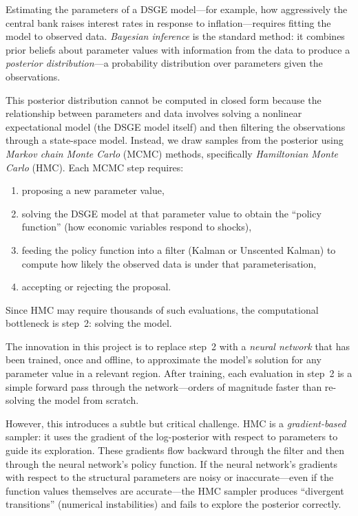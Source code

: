\documentclass[11pt,a4paper]{article}
\theoremstyle{definition}
\begin{document}
	Estimating the parameters of a DSGE model---for example, how aggressively the central bank raises interest rates in response to inflation---requires fitting the model to observed data.
	\emph{Bayesian inference} is the standard method: it combines prior beliefs about parameter values with information from the data to produce a \emph{posterior distribution}---a probability distribution over parameters given the observations.
	
	This posterior distribution cannot be computed in closed form because the relationship between parameters and data involves solving a nonlinear expectational model (the DSGE model itself) and then filtering the observations through a state-space model.
	Instead, we draw samples from the posterior using \emph{Markov chain Monte Carlo} (MCMC) methods, specifically \emph{Hamiltonian Monte Carlo} (HMC).
	Each MCMC step requires:
	\begin{enumerate}
		\item proposing a new parameter value,
		\item solving the DSGE model at that parameter value to obtain the ``policy function'' (how economic variables respond to shocks),
		\item feeding the policy function into a filter (Kalman or Unscented Kalman) to compute how likely the observed data is under that parameterisation,
		\item accepting or rejecting the proposal.
	\end{enumerate}
	Since HMC may require thousands of such evaluations, the computational bottleneck is step~2: solving the model.
	
	The innovation in this project is to replace step~2 with a \emph{neural network} that has been trained, once and offline, to approximate the model's solution for any parameter value in a relevant region.
	After training, each evaluation in step~2 is a simple forward pass through the network---orders of magnitude faster than re-solving the model from scratch.
	
	However, this introduces a subtle but critical challenge.
	HMC is a \emph{gradient-based} sampler: it uses the gradient of the log-posterior with respect to parameters to guide its exploration.
	These gradients flow backward through the filter and then through the neural network's policy function.
	If the neural network's gradients with respect to the structural parameters are noisy or inaccurate---even if the function values themselves are accurate---the HMC sampler produces ``divergent transitions'' (numerical instabilities) and fails to explore the posterior correctly.
	
\end{document}

